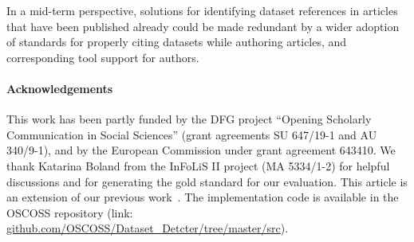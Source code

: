 \documentclass{IOS-Book-Article}
\newcommand{\dara}{\textsf{da\textbar ra}}
\begin{document}


In a mid-term perspective, solutions for identifying dataset references in articles that have been published already could be made redundant by a wider adoption of standards for properly citing datasets while authoring articles, and corresponding tool support for authors.

\paragraph{Acknowledgements}
This work has been partly funded by the DFG project “Opening Scholarly Communication in Social Sciences” 
(grant agreements SU 647/19-1 and AU 340/9-1), and by the European Commission under grant agreement 643410. 
We thank Katarina Boland from the InFoLiS II project (MA 5334/1-2) for helpful discussions and for generating the gold standard for our evaluation. 
This article is an extension of our previous work~\cite{ghavimi2016identifying}.
The implementation code is available in the OSCOSS repository (link: \url{github.com/OSCOSS/Dataset_Detcter/tree/master/src}). 


\end{document}
